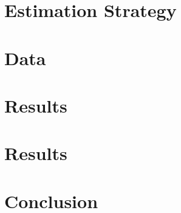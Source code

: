\documentclass[12pt, a4paper]{article}
\begin{document}
\section{\label{sec_strat}Estimation Strategy}



\section{\label{sec_data}Data}



\section{\label{sec_res}Results}

\section{\label{sec_res}Results}







\section{\label{sec_conc}Conclusion}


\end{document}
